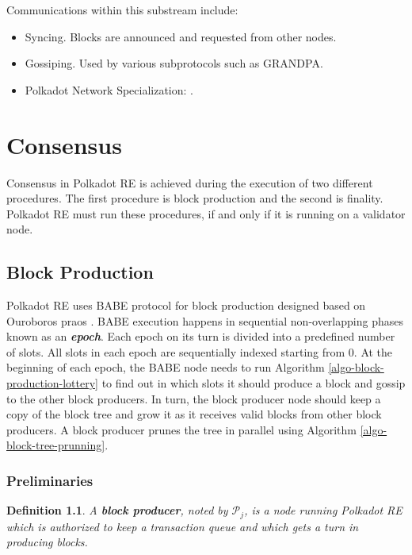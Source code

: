 \documentclass{book}
\newcommand{\tmem}[1]{{\em #1\/}}
\newcommand{\tmstrong}[1]{\textbf{#1}}
\newcommand{\tmtextbf}[1]{{\bfseries{#1}}}
\newcommand{\tmtextit}[1]{{\itshape{#1}}}
\newtheorem{definition}{Definition}
\providecommand{\tmem}[1]{\tmtextit{#1}}
\providecommand{\tmstrong}[1]{\tmtextbf{#1}}
\providecommand{\tmtextbf}[1]{\tmtextbf{#1}}
\providecommand{\tmtextit}[1]{\tmtextit{#1}}
\newtheorem{definition}{Definition}
\begin{document}
Communications within this substream include:
\begin{itemize}
  \item Syncing. Blocks are announced and requested from other nodes.
  
  \item Gossiping. Used by various subprotocols such as GRANDPA.
  
  \item Polkadot Network Specialization: {}.
\end{itemize}
\chapter{Consensus}\label{chap-consensu}

Consensus in Polkadot RE is achieved during the execution of two different
procedures. The first procedure is block production and the second is
finality. Polkadot RE must run these procedures, if and only if it is running
on a validator node.

\section{Block Production}\label{sect-babe}\label{sect-block-production}

Polkadot RE uses BABE protocol {\cite{w3f_research_group_blind_2019}} for
block production designed based on Ouroboros praos
{\cite{david_ouroboros_2018}}. BABE execution happens in sequential
non-overlapping phases known as an {\tmstrong{{\tmem{epoch}}}}. Each epoch on
its turn is divided into a predefined number of slots. All slots in each epoch
are sequentially indexed starting from 0. At the beginning of each epoch, the
BABE node needs to run Algorithm \ref{algo-block-production-lottery} to find
out in which slots it should produce a block and gossip to the other block
producers. In turn, the block producer node should keep a copy of the block
tree and grow it as it receives valid blocks from other block producers. A
block producer prunes the tree in parallel using Algorithm
\ref{algo-block-tree-prunning}.

\subsection{Preliminaries}

\begin{definition}
  A {\tmstrong{block producer}}, noted by $\mathcal{P}_j$, is a node running
  Polkadot RE which is authorized to keep a transaction queue and which gets a
  turn in producing blocks.
\end{definition}
\end{document}
